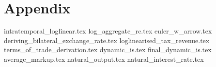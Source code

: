 \section{Appendix}
\appendix 
\renewcommand{\theequation}{A.\arabic{equation}}
{intratemporal_loglinear.tex}
{log_aggregate_rc.tex}
{euler_w_arrow.tex}
{deriving_bilateral_exchange_rate.tex}
{loglinearised_tax_revenue.tex}
{terms_of_trade_derivation.tex}
{dynamic_is.tex}
{final_dynamic_is.tex}
{average_markup.tex}
{natural_output.tex}
{natural_interest_rate.tex}
